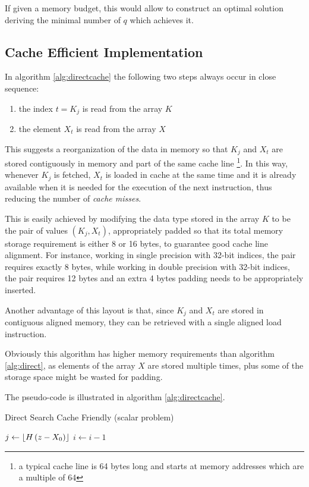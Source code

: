 \documentclass[preprint,1p,times]{elsarticle}
\begin{document}
If given a memory budget, this would allow to construct an optimal solution deriving the minimal number of $q$ which achieves it.

\subsection{Cache Efficient Implementation}
In algorithm \ref{alg:directcache} the following two steps always occur in close sequence:
\begin{enumerate}
	\item the index $t=K_j$ is read from the array $K$
	\item the element $X_t$ is read from the array $X$
\end{enumerate}
This suggests a reorganization of the data in memory so that $K_j$ and $X_t$ are stored contiguously in memory and part of the same cache line \footnote{a typical cache line is 64 bytes long and starts at memory addresses which are a multiple of 64}. In this way, whenever $K_j$ is fetched, $X_t$ is loaded in cache at the same time and it is already available when it is needed for the execution of the next instruction, thus reducing the number of \textit{cache misses}.

This is easily achieved by modifying the data type stored in the array $K$ to be the pair of values $(K_j,X_t)$, appropriately padded so that its total memory storage requirement is either 8 or 16 bytes, to guarantee good cache line alignment. For instance, working in single precision with 32-bit indices, the pair requires exactly 8 bytes, while working in double precision with 32-bit indices, the pair requires 12 bytes and an extra 4 bytes padding needs to be appropriately inserted.

Another advantage of this layout is that, since $K_j$ and $X_t$ are stored in contiguous aligned memory, they can be retrieved with a single aligned load instruction.

Obviously this algorithm has higher memory requirements than algorithm \ref{alg:direct}, as elements of the array $X$ are stored multiple times, plus some of the storage space might be wasted for padding.

The pseudo-code is illustrated in algorithm \ref{alg:directcache}.

\begin{algorithm}
	\caption{Direct Search Cache Friendly (scalar problem)}
	\label{alg:directcache}
	\begin{algorithmic}
		\State $j \leftarrow \left \lfloor  H \, (z-X_0)  \right \rfloor$
		 
			\State $i \leftarrow i-1$ 
		\EndIf
		\EndFunction
	\end{algorithmic}
\end{algorithm}
\end{document}
